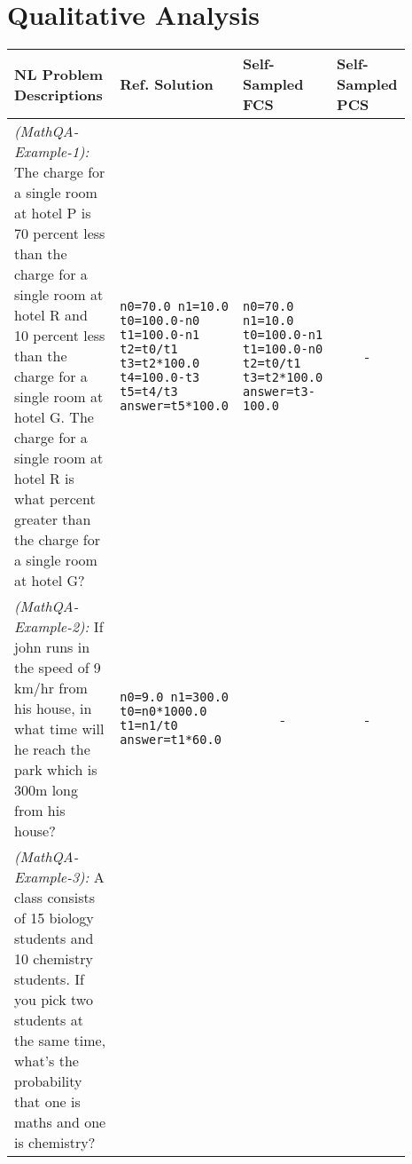 \section{Qualitative Analysis}
\label{sec:qualitative}
\begin{table}[t]
\centering
\small
\begin{tabular}{p{0.35\linewidth}p{0.18\linewidth}p{0.18\linewidth}p{0.18\linewidth}}
\toprule
\textbf{NL Problem Descriptions} & \textbf{Ref. Solution} & \textbf{Self-Sampled FCS} & \textbf{Self-Sampled PCS} \\\midrule
\textit{(MathQA-Example-1):} \newline
The charge for a single room at hotel P is 70 percent less than the charge for a single room at hotel R and 10 percent less than the charge for a single room at hotel G. The charge for a single room at hotel R is what percent greater than the charge for a single room at hotel G? & 
\texttt{n0=70.0\newline
n1=10.0\newline
t0=100.0-n0\newline
t1=100.0-n1\newline
t2=t0/t1\newline
t3=t2*100.0\newline
t4=100.0-t3\newline
t5=t4/t3\newline
answer=t5*100.0} &
\texttt{n0=70.0\newline
n1=10.0\newline
t0=100.0-n1\newline
t1=100.0-n0\newline
t2=t0/t1\newline
t3=t2*100.0\newline
answer=t3-100.0
}
& \multicolumn{1}{c}{-} \\\midrule
\textit{(MathQA-Example-2):} \newline
If john runs in the speed of 9 km/hr from his house, in what time will he reach the park which is 300m long from his house? &
\texttt{n0=9.0\newline
n1=300.0\newline
t0=n0*1000.0\newline
t1=n1/t0\newline
answer=t1*60.0
} &
\multicolumn{1}{c}{-} &
\multicolumn{1}{c}{-} \\\midrule
\textit{(MathQA-Example-3):} \newline
A class consists of 15 biology students and 10 chemistry students. If you pick two students at the same time, what's the probability that one is maths and one is chemistry? &

\end{tabular}
\end{table}
